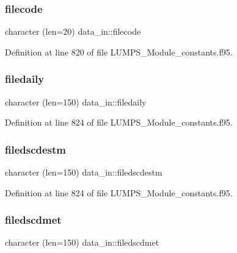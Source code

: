 \mbox{\label{namespacedata__in_a7f8949b7ebf799e7223eae9fd01a7749}} 
\subsubsection{\texorpdfstring{filecode}{filecode}}
{\footnotesize\ttfamily character (len=20) data\+\_\+in\+::filecode}



Definition at line 820 of file L\+U\+M\+P\+S\+\_\+\+Module\+\_\+constants.\+f95.

\mbox{\label{namespacedata__in_a46e1032d2b5b787e36c022a180204a49}} 
\subsubsection{\texorpdfstring{filedaily}{filedaily}}
{\footnotesize\ttfamily character (len=150) data\+\_\+in\+::filedaily}



Definition at line 824 of file L\+U\+M\+P\+S\+\_\+\+Module\+\_\+constants.\+f95.

\mbox{\label{namespacedata__in_aae47ad70ed5c4116cec7838aaaaa302a}} 
\subsubsection{\texorpdfstring{filedscdestm}{filedscdestm}}
{\footnotesize\ttfamily character (len=150) data\+\_\+in\+::filedscdestm}



Definition at line 824 of file L\+U\+M\+P\+S\+\_\+\+Module\+\_\+constants.\+f95.

\mbox{\label{namespacedata__in_ad0d0971b802f95d1a4fcc057771aee6b}} 
\subsubsection{\texorpdfstring{filedscdmet}{filedscdmet}}
{\footnotesize\ttfamily character (len=150) data\+\_\+in\+::filedscdmet}



